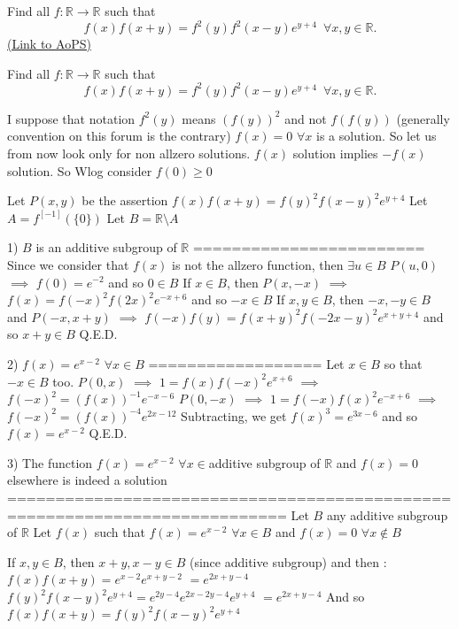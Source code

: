 \begin{problem}
	Find all $f:\mathbb{R}\to\mathbb{R}$ such that
\[
f(x)f(x+y)=f^2(y)f^2(x-y)e^{y+4}\,\,\,\forall x,y\in\mathbb{R}.
\]
	\flushright \href{https://artofproblemsolving.com/community/c6h488026}{(Link to AoPS)}
\end{problem}



\begin{solution}
	\begin{tcolorbox}Find all $f:\mathbb{R}\to\mathbb{R}$ such that
\[
f(x)f(x+y)=f^2(y)f^2(x-y)e^{y+4}\,\,\,\forall x,y\in\mathbb{R}.
\]\end{tcolorbox}
I suppose that notation $f^2(y)$ means $(f(y))^2$ and not $f(f(y))$ (generally convention on this forum is the contrary)
$f(x)=0$ $\forall x$ is a solution. So let us from now look only for non allzero solutions.
$f(x)$ solution implies $-f(x)$ solution. So Wlog consider $f(0)\ge 0$

Let $P(x,y)$ be the assertion $f(x)f(x+y)=f(y)^2f(x-y)^2e^{y+4}$
Let $A=f^{[-1]}(\{0\})$
Let $B=\mathbb R\setminus A$

1) $B$ is an additive subgroup of $\mathbb R$
========================
Since we consider that $f(x)$ is not the allzero function, then $\exists u\in B$
$P(u,0)$ $\implies$ $f(0)=e^{-2}$ and so $0\in B$
If $x\in B$, then $P(x,-x)$ $\implies$ $f(x)=f(-x)^2f(2x)^2e^{-x+6}$ and so $-x\in B$
If $x,y\in B$, then $-x,-y\in B$ and $P(-x,x+y)$ $\implies$ $f(-x)f(y)=f(x+y)^2f(-2x-y)^2e^{x+y+4}$ and so $x+y\in B$
Q.E.D.

2) $f(x)=e^{x-2}$ $\forall x\in B$
==================
Let $x\in B$ so that $-x\in B$ too.
$P(0,x)$ $\implies$ $1=f(x)f(-x)^2e^{x+6}$ $\implies$ $f(-x)^2=(f(x))^{-1}e^{-x-6}$
$P(0,-x)$ $\implies$ $1=f(-x)f(x)^2e^{-x+6}$ $\implies$ $f(-x)^2=(f(x))^{-4}e^{2x-12}$
Subtracting, we get $f(x)^{3}=e^{3x-6}$ and so $f(x)=e^{x-2}$
Q.E.D.

3) The function $f(x)=e^{x-2}$ $\forall x\in$additive subgroup of $\mathbb R$ and $f(x)=0$ elsewhere is indeed a solution
===========================================================================
Let $B$ any additive subgroup of $\mathbb R$
Let $f(x)$ such that $f(x)=e^{x-2}$ $\forall x\in B$ and $f(x)=0$ $\forall x\notin B$

If $x,y\in B$, then $x+y,x-y\in B$ (since additive subgroup) and then :
$f(x)f(x+y)=e^{x-2}e^{x+y-2}$ $=e^{2x+y-4}$
$f(y)^2f(x-y)^2e^{y+4}=e^{2y-4}e^{2x-2y-4}e^{y+4}$ $=e^{2x+y-4}$
And so $f(x)f(x+y)=f(y)^2f(x-y)^2e^{y+4}$


\end{solution}
